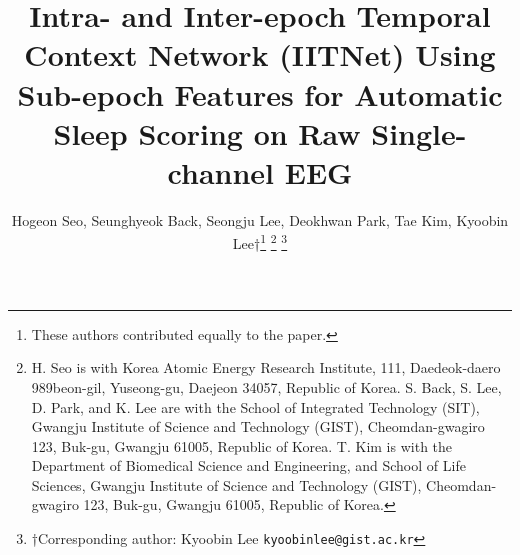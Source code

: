 \documentclass[10pt,twocolumn,twoside]{IEEEtran}
\begin{document}
\title{Intra- and Inter-epoch Temporal Context Network (IITNet) Using Sub-epoch Features for Automatic Sleep Scoring on Raw Single-channel EEG}


	
	\author{
        Hogeon Seo,
        Seunghyeok Back, 
        Seongju Lee,
        Deokhwan Park,
        Tae Kim,
        Kyoobin Lee†\thanks{\text{*}  These authors contributed equally to the paper.}
		\thanks{H. Seo is with Korea Atomic Energy Research Institute, 111, Daedeok-daero 989beon-gil, Yuseong-gu, Daejeon 34057, Republic of Korea.\newline
		S. Back, S. Lee, D. Park, and K. Lee are with the School of Integrated Technology (SIT), Gwangju Institute of Science and Technology (GIST), Cheomdan-gwagiro 123, Buk-gu, Gwangju 61005, Republic of Korea. \newline
		T. Kim is with the Department of Biomedical Science and Engineering, and School of Life Sciences, Gwangju Institute of Science and Technology (GIST), Cheomdan-gwagiro 123, Buk-gu, Gwangju 61005, Republic of Korea.}
		\thanks{†Corresponding author: Kyoobin Lee {\tt\footnotesize kyoobinlee@gist.ac.kr}}}
	


	
	


	
	
	


	
	


	
	
\end{document}
